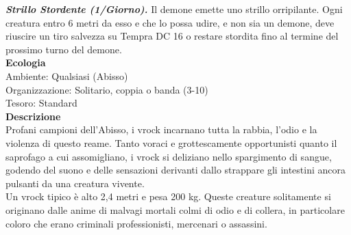 \begin{multicols}{2}
\emph{\textbf{Strillo Stordente (1/Giorno).}} Il demone emette uno strillo orripilante. Ogni creatura entro 6 metri da esso e che lo possa udire, e non sia un demone, deve riuscire un tiro salvezza su Tempra DC  16 o restare stordita fino al termine del prossimo turno del demone.\\
\textbf{Ecologia}\\
Ambiente: Qualsiasi (Abisso)\\
Organizzazione: Solitario, coppia o banda (3-10)\\
Tesoro: Standard\\
\textbf{Descrizione}\\
Profani campioni dell’Abisso, i vrock incarnano tutta la rabbia, l’odio e la violenza di questo reame. Tanto voraci e grottescamente opportunisti quanto il saprofago a cui assomigliano, i vrock si deliziano nello spargimento di sangue, godendo del suono e delle sensazioni derivanti dallo strappare gli intestini ancora pulsanti da una creatura vivente.\\
Un vrock tipico è alto 2,4 metri e pesa 200 kg. Queste creature solitamente si originano dalle anime di malvagi mortali colmi di odio e di collera, in particolare coloro che erano criminali professionisti, mercenari o assassini.\\


\end{multicols}
